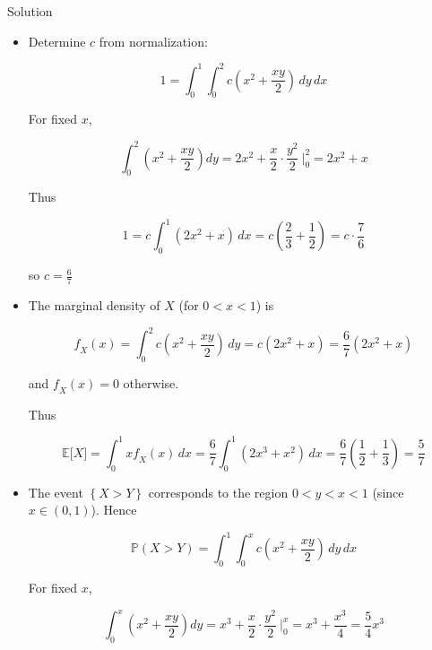 \begin{qlsolution}{Solution}

\begin{itemize}
\item
  Determine \(\mathit{c}\) from normalization:

  \[1 = \int_{0}^{1}\int_{0}^{2}\mathit{c}\left( {\mathit{x}^{2} + \frac{\mathit{x}\mathit{y}}{2}} \right)\,\mathit{d}\mathit{y}\,\mathit{d}\mathit{x}\]

  For fixed \(\mathit{x}\),

  \[\int_{0}^{2}\left( {\mathit{x}^{2} + \frac{\mathit{x}\mathit{y}}{2}} \right)\mathit{d}\mathit{y} = 2\mathit{x}^{2} + \frac{\mathit{x}}{2} \cdot \frac{\mathit{y}^{2}}{2}\ |_{0}^{2} = 2\mathit{x}^{2} + \mathit{x}\]

  Thus

  \[1 = \mathit{c}\int_{0}^{1}(2\mathit{x}^{2} + \mathit{x})\,\mathit{d}\mathit{x} = \mathit{c}\left( {\frac{2}{3} + \frac{1}{2}} \right) = \mathit{c} \cdot \frac{7}{6}\]

  so \(\mathit{c} = \frac{6}{7}\)
\item
  The marginal density of \(\mathit{X}\) (for \(0 < \mathit{x} < 1\)) is

  \[\mathit{f}_{\mathit{X}}(\mathit{x}) = \int_{0}^{2}\mathit{c}\left( {\mathit{x}^{2} + \frac{\mathit{x}\mathit{y}}{2}} \right)\,\mathit{d}\mathit{y} = \mathit{c}(2\mathit{x}^{2} + \mathit{x}) = \frac{6}{7}(2\mathit{x}^{2} + \mathit{x})\]

  and \(\mathit{f}_{\mathit{X}}(\mathit{x}) = 0\) otherwise.

  Thus

  \[\mathbb{E}\lbrack\mathit{X}\rbrack = \int_{0}^{1}\mathit{x}\mathit{f}_{\mathit{X}}(\mathit{x})\,\mathit{d}\mathit{x} = \frac{6}{7}\int_{0}^{1}(2\mathit{x}^{3} + \mathit{x}^{2})\,\mathit{d}\mathit{x} = \frac{6}{7}\left( {\frac{1}{2} + \frac{1}{3}} \right) = \frac{5}{7}\]
\item
  The event \(\left\{ {\mathit{X} > \mathit{Y}} \right\}\) corresponds to the region \(0 < \mathit{y} < \mathit{x} < 1\) (since \(\mathit{x} \in (0,1)\)). Hence

  \[\mathbb{P}(\mathit{X} > \mathit{Y}) = \int_{0}^{1}\int_{0}^{\mathit{x}}\mathit{c}\left( {\mathit{x}^{2} + \frac{\mathit{x}\mathit{y}}{2}} \right)\,\mathit{d}\mathit{y}\,\mathit{d}\mathit{x}\]

  For fixed \(\mathit{x}\),

  \[\int_{0}^{\mathit{x}}\left( {\mathit{x}^{2} + \frac{\mathit{x}\mathit{y}}{2}} \right)\mathit{d}\mathit{y} = \mathit{x}^{3} + \frac{\mathit{x}}{2} \cdot \frac{\mathit{y}^{2}}{2}\ |_{0}^{\mathit{x}} = \mathit{x}^{3} + \frac{\mathit{x}^{3}}{4} = \frac{5}{4}\mathit{x}^{3}\]


\end{itemize}
\end{qlsolution}
